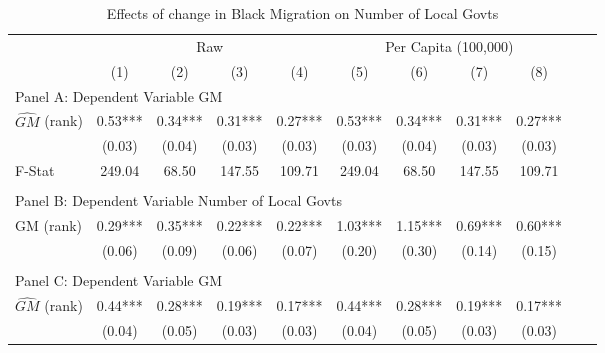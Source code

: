  \begin{table}[htbp]\centering {} \begin{threeparttable} \caption{Effects of change in Black Migration on Number of Local Govts} \begin{tabular}{l*{10}{c}} \toprule
                &\multicolumn{4}{c}{Raw}                                    &\multicolumn{4}{c}{Per Capita (100,000)}                   \\\cmidrule(lr){2-5}\cmidrule(lr){6-9}
                &\multicolumn{1}{c}{(1)}   &\multicolumn{1}{c}{(2)}   &\multicolumn{1}{c}{(3)}   &\multicolumn{1}{c}{(4)}   &\multicolumn{1}{c}{(5)}   &\multicolumn{1}{c}{(6)}   &\multicolumn{1}{c}{(7)}   &\multicolumn{1}{c}{(8)}   \\
\cmidrule(lr){1-9}
\multicolumn{8}{l}{Panel A: Dependent Variable GM}\\
\cmidrule(lr){1-9}
$\hat{GM}$ (rank)&       0.53***&       0.34***&       0.31***&       0.27***&       0.53***&       0.34***&       0.31***&       0.27***\\
                &     (0.03)   &     (0.04)   &     (0.03)   &     (0.03)   &     (0.03)   &     (0.04)   &     (0.03)   &     (0.03)   \\
\midrule
F-Stat          &     249.04   &      68.50   &     147.55   &     109.71   &     249.04   &      68.50   &     147.55   &     109.71   \\
\cmidrule[\heavyrulewidth](lr){1-9} \\ \cmidrule[\heavyrulewidth](lr){1-9}
\multicolumn{8}{l}{Panel B: Dependent Variable Number of Local Govts}\\
\cmidrule(lr){1-9}
GM  (rank)      &       0.29***&       0.35***&       0.22***&       0.22***&       1.03***&       1.15***&       0.69***&       0.60***\\
                &     (0.06)   &     (0.09)   &     (0.06)   &     (0.07)   &     (0.20)   &     (0.30)   &     (0.14)   &     (0.15)   \\
\cmidrule[\heavyrulewidth](lr){1-9} \\ \cmidrule[\heavyrulewidth](lr){1-9}
\multicolumn{8}{l}{Panel C: Dependent Variable GM}\\
\cmidrule(lr){1-9}
$\hat{GM}$ (rank)&       0.44***&       0.28***&       0.19***&       0.17***&       0.44***&       0.28***&       0.19***&       0.17***\\
                &     (0.04)   &     (0.05)   &     (0.03)   &     (0.03)   &     (0.04)   &     (0.05)   &     (0.03)   &     (0.03)   \\

\end{tabular}
\end{threeparttable}
\end{table}
